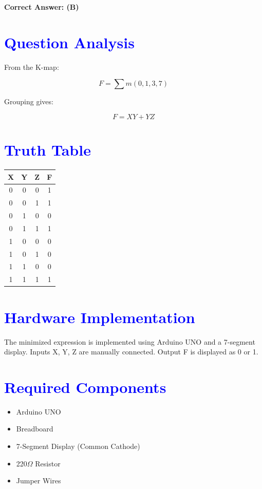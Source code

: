 \documentclass[12pt,a4paper]{article}
\begin{document}
\vspace{0.3cm}
\textbf{Correct Answer: (B)}

\section*{\textcolor{blue}{Question Analysis}}

From the K-map:

\[
F = \sum m(0,1,3,7)
\]

Grouping gives:

\[
F = XY + YZ
\]

\section*{\textcolor{blue}{Truth Table}}

\begin{center}
\begin{tabular}{|c|c|c|c|}
\hline
X & Y & Z & F \\
\hline
0 & 0 & 0 & 1 \\
0 & 0 & 1 & 1 \\
0 & 1 & 0 & 0 \\
0 & 1 & 1 & 1 \\
1 & 0 & 0 & 0 \\
1 & 0 & 1 & 0 \\
1 & 1 & 0 & 0 \\
1 & 1 & 1 & 1 \\
\hline
\end{tabular}
\end{center}

\section*{\textcolor{blue}{Hardware Implementation}}

The minimized expression is implemented using Arduino UNO and a 7-segment display.  
Inputs X, Y, Z are manually connected.  
Output F is displayed as 0 or 1.

\section*{\textcolor{blue}{Required Components}}

\begin{itemize}
\item Arduino UNO
\item Breadboard
\item 7-Segment Display (Common Cathode)
\item 220$\Omega$ Resistor
\item Jumper Wires
\end{itemize}
\end{document}
